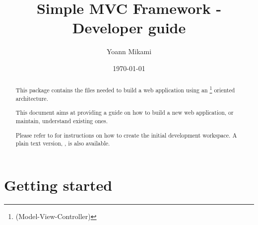 \documentclass[pdftex,12pt,a4paper]{article}
\begin{document}
\title{Simple MVC Framework - Developer guide}
\author{Yoann Mikami}
\date{\today}
\maketitle

\begin{abstract}
This package contains the files needed to build a web application using
an \footnote{(Model-View-Controller)} oriented architecture.

This document aims at providing a guide on how to build a new web application,
or maintain, understand existing ones.

Please refer to  for instructions on how to create the initial development workspace.
A plain text version, , is also available.
\end{abstract}

\tableofcontents

\cleardoublepage

\section{Getting started} \label{sec:getting-started}
\end{document}
